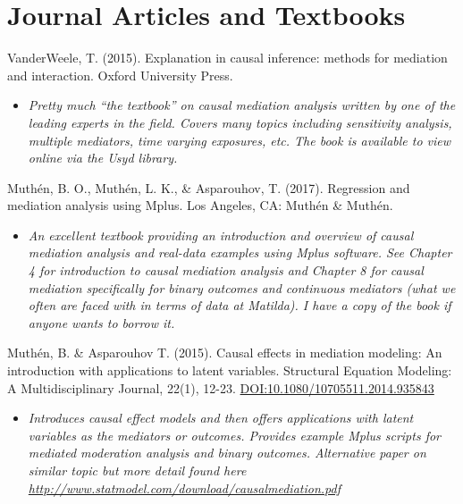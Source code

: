 \documentclass[
]{book}
\providecommand{\tightlist}{%
  \setlength{\itemsep}{0pt}\setlength{\parskip}{0pt}}
\begin{document}
\hypertarget{journal-articles-and-textbooks-3}{%
\section{Journal Articles and Textbooks}\label{journal-articles-and-textbooks-3}}

VanderWeele, T. (2015). Explanation in causal inference: methods for mediation and interaction. Oxford University Press.

\begin{itemize}
\tightlist
\item
  \emph{Pretty much ``the textbook'' on causal mediation analysis written by one of the leading experts in the field. Covers many topics including sensitivity analysis, multiple mediators, time varying exposures, etc. The book is available to view online via the Usyd library. }
\end{itemize}

Muthén, B. O., Muthén, L. K., \& Asparouhov, T. (2017). Regression and mediation analysis using Mplus. Los Angeles, CA: Muthén \& Muthén.

\begin{itemize}
\tightlist
\item
  \emph{An excellent textbook providing an introduction and overview of causal mediation analysis and real-data examples using Mplus software. See Chapter 4 for introduction to causal mediation analysis and Chapter 8 for causal mediation specifically for binary outcomes and continuous mediators (what we often are faced with in terms of data at Matilda). I have a copy of the book if anyone wants to borrow it.}
\end{itemize}

Muthén, B. \& Asparouhov T. (2015). Causal effects in mediation modeling: An introduction with applications to latent variables. Structural Equation Modeling: A Multidisciplinary Journal, 22(1), 12-23. \url{DOI:10.1080/10705511.2014.935843}

\begin{itemize}
\tightlist
\item
  \emph{Introduces causal effect models and then offers applications with latent variables as the mediators or outcomes. Provides example Mplus scripts for mediated moderation analysis and binary outcomes. Alternative paper on similar topic but more detail found here \url{http://www.statmodel.com/download/causalmediation.pdf}}
\end{itemize}
\end{document}
